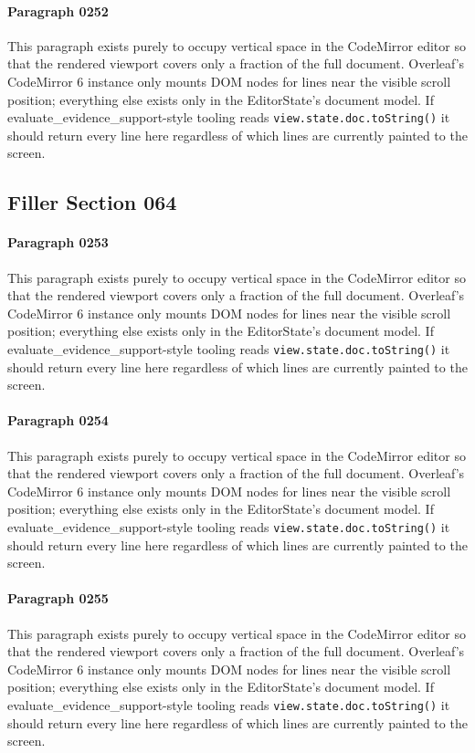 \documentclass{article}
\begin{document}
\paragraph{Paragraph 0252}
This paragraph exists purely to occupy vertical space in the CodeMirror editor so that the rendered viewport covers only a fraction of the full document. Overleaf's CodeMirror 6 instance only mounts DOM nodes for lines near the visible scroll position; everything else exists only in the EditorState's document model. If evaluate\_evidence\_support-style tooling reads \texttt{view.state.doc.toString()} it should return every line here regardless of which lines are currently painted to the screen.

\subsection{Filler Section 064}
\paragraph{Paragraph 0253}
This paragraph exists purely to occupy vertical space in the CodeMirror editor so that the rendered viewport covers only a fraction of the full document. Overleaf's CodeMirror 6 instance only mounts DOM nodes for lines near the visible scroll position; everything else exists only in the EditorState's document model. If evaluate\_evidence\_support-style tooling reads \texttt{view.state.doc.toString()} it should return every line here regardless of which lines are currently painted to the screen.

\paragraph{Paragraph 0254}
This paragraph exists purely to occupy vertical space in the CodeMirror editor so that the rendered viewport covers only a fraction of the full document. Overleaf's CodeMirror 6 instance only mounts DOM nodes for lines near the visible scroll position; everything else exists only in the EditorState's document model. If evaluate\_evidence\_support-style tooling reads \texttt{view.state.doc.toString()} it should return every line here regardless of which lines are currently painted to the screen.

\paragraph{Paragraph 0255}
This paragraph exists purely to occupy vertical space in the CodeMirror editor so that the rendered viewport covers only a fraction of the full document. Overleaf's CodeMirror 6 instance only mounts DOM nodes for lines near the visible scroll position; everything else exists only in the EditorState's document model. If evaluate\_evidence\_support-style tooling reads \texttt{view.state.doc.toString()} it should return every line here regardless of which lines are currently painted to the screen.
\end{document}
